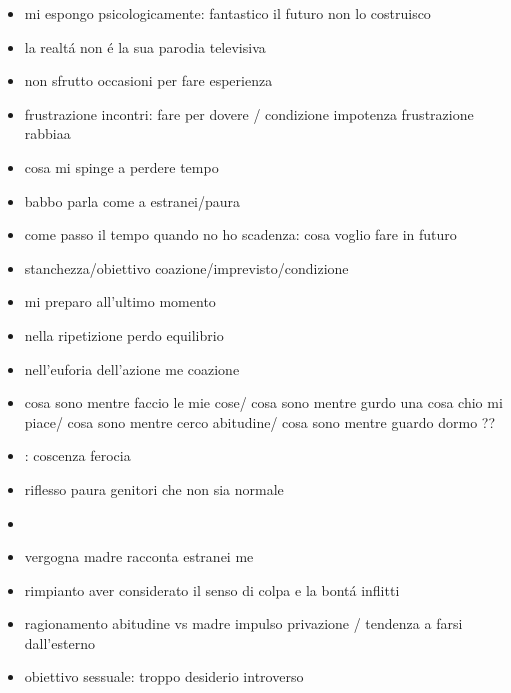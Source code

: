 \begin{itemize}
\item mi espongo psicologicamente: fantastico il futuro non lo costruisco

\item la realt\'a non  \'e la sua parodia televisiva

\item non sfrutto occasioni per fare esperienza

\item frustrazione incontri: fare per dovere / condizione impotenza frustrazione rabbiaa

\item cosa mi spinge a perdere tempo

\item babbo parla come a estranei/paura

\item come passo il tempo quando no ho scadenza: cosa voglio fare in futuro

\item stanchezza/obiettivo coazione/imprevisto/condizione

\item mi preparo all'ultimo momento

\item nella ripetizione perdo equilibrio

\item nell'euforia dell'azione me coazione

\item cosa sono mentre faccio le mie cose/ cosa sono mentre gurdo una cosa chio mi piace/ cosa sono mentre cerco abitudine/ cosa sono mentre guardo dormo ??

\item {}: coscenza ferocia

\item riflesso paura genitori che non sia normale

\item {}

\item vergogna madre racconta estranei me

\item rimpianto aver considerato il senso di colpa e la bont\'a inflitti

\item ragionamento abitudine vs madre impulso privazione / tendenza a farsi dall'esterno

\item obiettivo sessuale: troppo desiderio introverso 

\end{itemize}